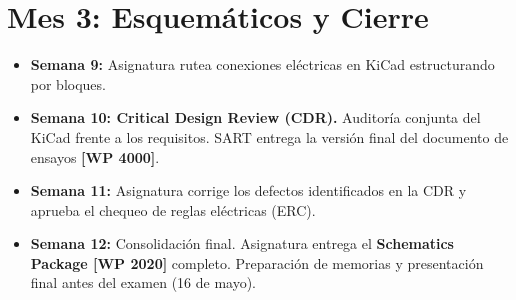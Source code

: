 \section{Mes 3: Esquemáticos y Cierre}
\begin{itemize}
    \item \textbf{Semana 9:} Asignatura rutea conexiones eléctricas en KiCad estructurando por bloques.
    \item \textbf{Semana 10: Critical Design Review (CDR).} Auditoría conjunta del KiCad frente a los requisitos. SART entrega la versión final del documento de ensayos \textbf{[WP 4000]}.
    \item \textbf{Semana 11:} Asignatura corrige los defectos identificados en la CDR y aprueba el chequeo de reglas eléctricas (ERC).
    \item \textbf{Semana 12:} Consolidación final. Asignatura entrega el \textbf{Schematics Package [WP 2020]} completo. Preparación de memorias y presentación final antes del examen (16 de mayo).
\end{itemize}